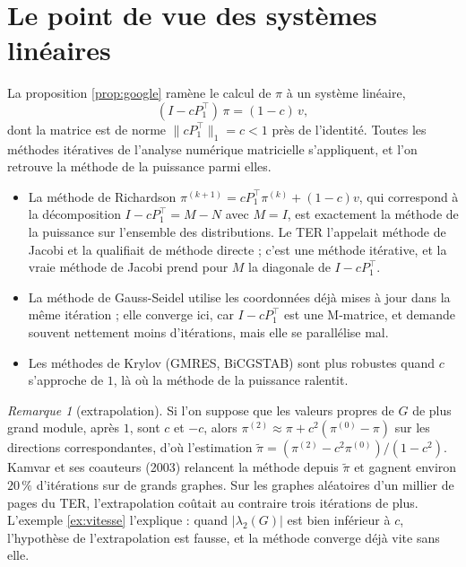 \documentclass[11pt,a4paper]{article}
\theoremstyle{plain}
\theoremstyle{definition}
\theoremstyle{remark}
\newtheorem{remarque}[theoreme]{Remarque}
\begin{document}
\section{Le point de vue des systèmes linéaires}

La proposition \ref{prop:google} ramène le calcul de $\pi$ à un système linéaire,
\[
  (I-cP_1^\top)\,\pi=(1-c)\,v ,
\]
dont la matrice est de norme $\|cP_1^\top\|_1=c<1$ près de l'identité. Toutes les méthodes itératives de l'analyse numérique matricielle s'appliquent, et l'on retrouve la méthode de la puissance parmi elles.

\begin{itemize}
\item La méthode de Richardson $\pi^{(k+1)}=cP_1^\top\pi^{(k)}+(1-c)v$, qui correspond à la décomposition $I-cP_1^\top=M-N$ avec $M=I$, est exactement la méthode de la puissance sur l'ensemble des distributions. Le TER l'appelait méthode de Jacobi et la qualifiait de méthode directe ; c'est une méthode itérative, et la vraie méthode de Jacobi prend pour $M$ la diagonale de $I-cP_1^\top$.
\item La méthode de Gauss-Seidel utilise les coordonnées déjà mises à jour dans la même itération ; elle converge ici, car $I-cP_1^\top$ est une M-matrice, et demande souvent nettement moins d'itérations, mais elle se parallélise mal.
\item Les méthodes de Krylov (GMRES, BiCGSTAB) sont plus robustes quand $c$ s'approche de $1$, là où la méthode de la puissance ralentit.
\end{itemize}

\begin{remarque}[extrapolation]
Si l'on suppose que les valeurs propres de $G$ de plus grand module, après $1$, sont $c$ et $-c$, alors $\pi^{(2)}\approx\pi+c^2(\pi^{(0)}-\pi)$ sur les directions correspondantes, d'où l'estimation $\tilde\pi=(\pi^{(2)}-c^2\pi^{(0)})/(1-c^2)$. Kamvar et ses coauteurs (2003) relancent la méthode depuis $\tilde\pi$ et gagnent environ $20\,\%$ d'itérations sur de grands graphes. Sur les graphes aléatoires d'un millier de pages du TER, l'extrapolation coûtait au contraire trois itérations de plus. L'exemple \ref{ex:vitesse} l'explique : quand $|\lambda_2(G)|$ est bien inférieur à $c$, l'hypothèse de l'extrapolation est fausse, et la méthode converge déjà vite sans elle.
\end{remarque}
\end{document}
